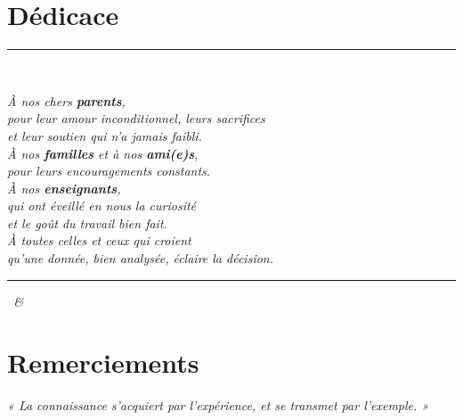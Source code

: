 \chapter*{Dédicace}
\thispagestyle{plain}

\vspace*{1.5cm}
\begin{center}
\textcolor{accent}{\rule{0.32\linewidth}{1.2pt}}\\[1.4cm]
\end{center}

\begin{center}\large\itshape
{}
À nos chers \textbf{parents},\\
pour leur amour inconditionnel, leurs sacrifices\\
et leur soutien qui n'a jamais faibli.\\[1.1cm]

À nos \textbf{familles} et à nos \textbf{ami(e)s},\\
pour leurs encouragements constants.\\[1.1cm]

À nos \textbf{enseignants},\\
qui ont éveillé en nous la curiosité\\
et le goût du travail bien fait.\\[1.1cm]

À toutes celles et ceux qui croient\\
qu'une donnée, bien analysée, éclaire la décision.
\end{center}

\vspace{1cm}
\begin{center}
\textcolor{accent}{\rule{0.32\linewidth}{1.2pt}}
\end{center}
\begin{flushright}\itshape
\auteurun\ \& \auteurdeux
\end{flushright}

\chapter*{Remerciements}

\begin{center}\itshape
« La connaissance s'acquiert par l'expérience, et se transmet par l'exemple. »
\end{center}
\vspace{0.8cm}

